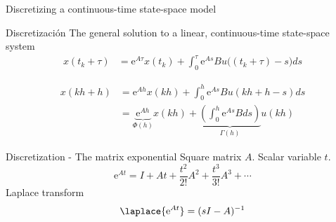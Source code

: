 \documentclass[presentation,aspectratio=1610]{beamer}
\begin{document}
\begin{frame}[label={sec:org5cb34e5}]{Discretizing a continuous-time state-space model}
\end{frame}
\begin{frame}[label={sec:org405ee0b}]{Discretización}
The general solution to a linear, continuous-time state-space system
\begin{align*}
x(t_k+\tau)& = \mathrm{e}^{A\tau} x(t_k) + \int_{0}^\tau \mathrm{e}^{As} B u\big((t_k+\tau)-s) ds
\end{align*}

\begin{center}
\end{center}

 \begin{align*}
  x(kh+h) &= \mathrm{e}^{Ah} x(kh) + \int_{0}^{h} \mathrm{e}^{As} B u(kh+h-s) ds\\
   &= \underbrace{\mathrm{e}^{Ah}}_{\Phi(h)} x(kh) + \underbrace{\left(\int_{0}^h \mathrm{e}^{As} B ds \right)}_{\Gamma(h)} u(kh)
\end{align*}
\end{frame}

\begin{frame}[label={sec:org94d39e8}]{Discretization - The matrix exponential}
Square matrix \(A\). Scalar variable \(t\).
\[ \mathrm{e}^{At} = I + At + \frac{t^2}{2!}A^2 + \frac{t^3}{3!} A^3 + \cdots\]
Laplace transform
\[ \laplace{\mathrm{e}^{At}} = (sI - A)^{-1}\]
\end{frame}
\end{document}
